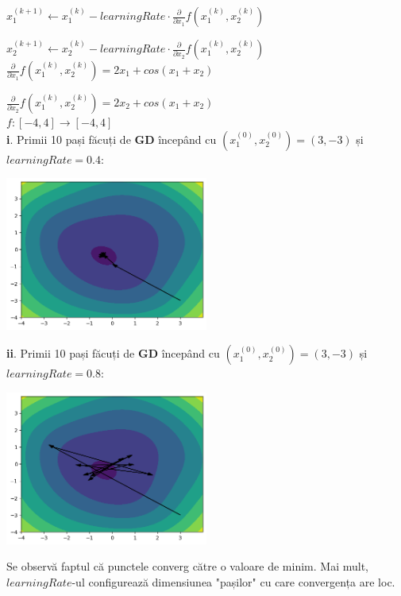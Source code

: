 \documentclass{article}
\begin{document}
\( x_1^{(k+1)} \leftarrow x_1^{(k)} - learningRate \cdot \frac{\partial}{\partial x_1} f(x_1^{(k)}, x_2^{(k)}) \)

\( x_2^{(k+1)} \leftarrow x_2^{(k)} - learningRate \cdot \frac{\partial}{\partial x_2} f(x_1^{(k)}, x_2^{(k)}) \) \\

\( \frac{\partial}{\partial x_1} f(x_1^{(k)}, x_2^{(k)}) = 2x_1 + cos(x_1 + x_2) \)

\( \frac{\partial}{\partial x_2} f(x_1^{(k)}, x_2^{(k)}) = 2x_2 + cos(x_1 + x_2) \) \\

\( f : [-4, 4] \to [-4, 4] \) \\

\textbf{i}. Primii 10 pași făcuți de \textbf{GD} începând cu \( (x_1^{(0)}, x_2^{(0)}) = (3, -3) \) și \( learningRate = 0.4 \):

\begin{center}
    \includegraphics[width=0.5\textwidth]{1.png}
\end{center}

\textbf{ii}. Primii 10 pași făcuți de \textbf{GD} începând cu \( (x_1^{(0)}, x_2^{(0)}) = (3, -3) \) și \( learningRate = 0.8 \):

\begin{center}
    \includegraphics[width=0.5\textwidth]{2.png}
\end{center}

Se observă faptul că punctele converg către o valoare de minim. Mai mult, \( learningRate \)-ul configurează dimensiunea "pașilor" cu care convergența are loc.
\end{document}
